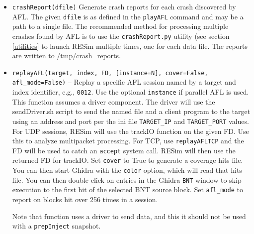 \documentclass[titlepage]{article}
\begin{document}
\begin{itemize}
The {\tt playAFL} command generates a coverage file for each AFL queue file and those are stored in a {\tt coverage} directory alongside the {\tt queue} directory.
Those individual coverage files are intended to be read by the {\tt findBB.py} utility to find sessions that lead to BNTs.  
The {\tt runPlay} stand-alone command launches parallel instances of RESim running the playAFL, for use in replaying sessions created by parallel fuzzing.  Note however this 
does not generate a new total hits file, it only creates coverage files.  

If processes exit during replay, those will be reported after {\tt playAFL} completes replaying the sessions.

See the {\tt IGNORE\_BB\_LIST} and code coverage discussion at \ref{coverage} to understand how to ignore some basic blocks.

\item{\tt crashReport(dfile)} Generate crash reports for each crash discovered by AFL.  The given {\tt dfile} is as defined in the {\tt playAFL} command and may
be a path to a single file.  The recommended method for processing multiple crashes found by AFL is to use the {\tt crashReport.py} utility (see section \ref{utilities} to launch RESim multiple times,
one for each data file.  The reports are written to /tmp/crash\_reports.

\item{\tt replayAFL(target, index, FD, [instance=N], cover=False, afl\_mode=False)} -- Replay a specific AFL session named by a target and index identifier, e.g., {\tt 0012}.  Use the optional {\tt instance} if parallel AFL is used.  This function assumes a driver component. The driver will use the sendDriver.sh script to send the named file and
a client program to the target using an address and port per the ini file {\tt TARGET\_IP} and {\tt TARGET\_PORT} values.  For UDP sessions, RESim will use the trackIO function on the given FD.  Use this to analyze multipacket processing.  For TCP, use {\tt replayAFLTCP} and the FD will be used to catch an {\tt accept} system call.  RESim will then use the returned FD for trackIO.  Set {\tt cover} to True to generate a coverage hits file.  You can then start Ghidra with the {\tt color} option, which
will read that hits file.   You can then double click on entries in the Ghidra {\tt BNT} window to skip execution to the first hit of the selected BNT source block.
Set {\tt afl\_mode} to report on blocks hit over 256 times in a session.

Note that function uses a driver to send data, and this it should not be used with a {\tt prepInject} snapshot.


\end{itemize}
\end{document}
